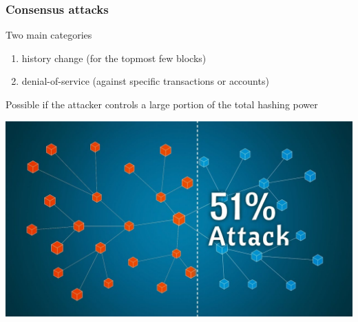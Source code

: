 \documentclass[11pt]{beamer}  %
\begin{document}
\begin{frame}\frametitle{Consensus attacks}

  \begin{greenbox}{Two main categories}
    \begin{enumerate}
    \item history change (for the topmost few blocks)
    \item denial-of-service (against specific transactions or accounts)
    \end{enumerate}
  \end{greenbox}

  \bigskip

  Possible if the attacker controls a large portion of the total hashing power

  \begin{center}
    \includegraphics[scale=0.17,clip=false]{pictures/51-percenters.jpg}
  \end{center}

\end{frame}
\end{document}
